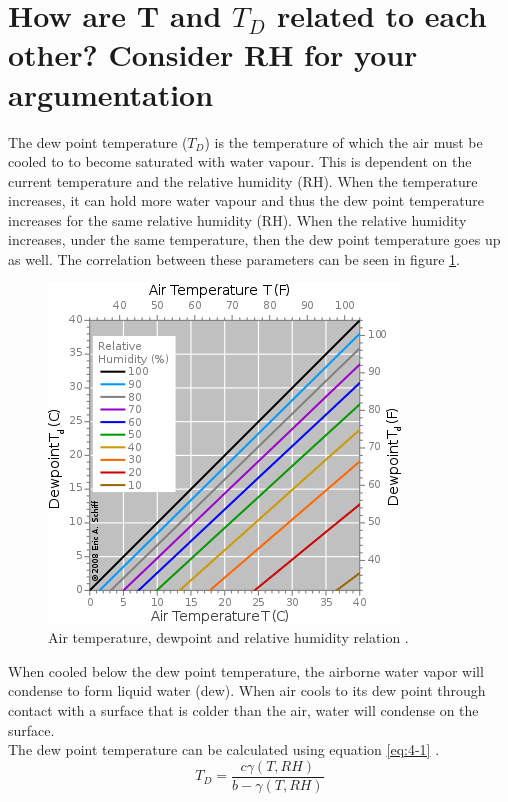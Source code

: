 \documentclass{article}
\begin{document}
\newpage
\section{How are T and $T_D$ related to each other? Consider RH for your argumentation}
The dew point temperature ($T_D$) is the temperature of which the air must be cooled to to become saturated with water vapour. This is dependent on the current temperature and the relative humidity (RH). When the temperature increases, it can hold more water vapour and thus the dew point temperature increases for the same relative humidity (RH). When the relative humidity increases, under the same temperature, then the dew point temperature goes up as well. The correlation between these parameters can be seen in figure \ref{fig:Q4}.\\

\begin{figure}[H]
	\centering
	\includegraphics[width=.5\textwidth]{figures/Dewpoint-RH.png}
	\caption{Air temperature, dewpoint and relative humidity relation \cite{wikiQ4}.}
	\label{fig:Q4}
\end{figure}

When cooled below the dew point temperature, the airborne water vapor will condense to form liquid water (dew). When air cools to its dew point through contact with a surface that is colder than the air, water will condense on the surface.\\

The dew point temperature can be calculated using equation \ref{eq:4-1} \cite{wikiQ4}.
\begin{equation}
T_D = \frac{c \gamma (T, RH)}{b - \gamma (T, RH)} \label{eq:4-1}
\end{equation}
\end{document}
